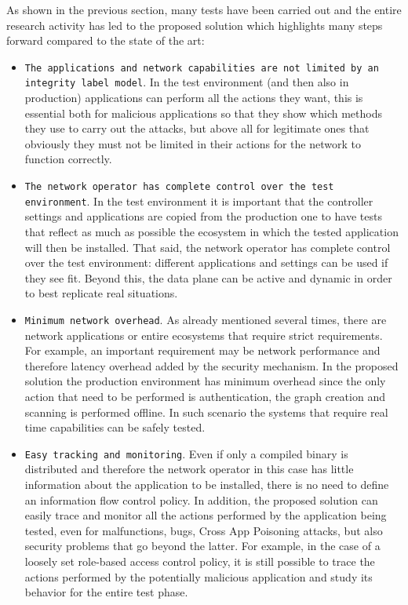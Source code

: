 \documentclass[a4paper,10pt]{memoir}
\begin{document}
{%
As shown in the previous section, many tests have been carried out and the entire research activity has led to the proposed solution which highlights many steps forward compared to the state of the art:
\begin{itemize}
    \item \texttt{The applications and network capabilities are not limited by an integrity label model}. In the test environment (and then also in production) applications can perform all the actions they want, this is essential both for malicious applications so that they show which methods they use to carry out the attacks, but above all for legitimate ones that obviously they must not be limited in their actions for the network to function correctly.
    \item \texttt{The network operator has complete control over the test environment}. In the test environment it is important that the controller settings and applications are copied from the production one to have tests that reflect as much as possible the ecosystem in which the tested application will then be installed. That said, the network operator has complete control over the test environment: different applications and settings can be used if they see fit. Beyond this, the data plane can be active and dynamic in order to best replicate real situations.
    \item \texttt{Minimum network overhead}. As already mentioned several times, there are network applications or entire ecosystems that require strict requirements. For example, an important requirement may be network performance and therefore latency overhead added by the security mechanism. In the proposed solution the production environment has minimum overhead since the only action that need to be performed is authentication, the graph creation and scanning is performed offline. In such scenario the systems that require real time capabilities can be safely tested.
    \item \texttt{Easy tracking and monitoring}. Even if only a compiled binary is distributed and therefore the network operator in this case has little information about the application to be installed, there is no need to define an information flow control policy. In addition, the proposed solution can easily trace and monitor all the actions performed by the application being tested, even for malfunctions, bugs, Cross App Poisoning attacks, but also security problems that go beyond the latter. For example, in the case of a loosely set role-based access control policy, it is still possible to trace the actions performed by the potentially malicious application and study its behavior for the entire test phase.
\end{itemize}

}
\end{document}

